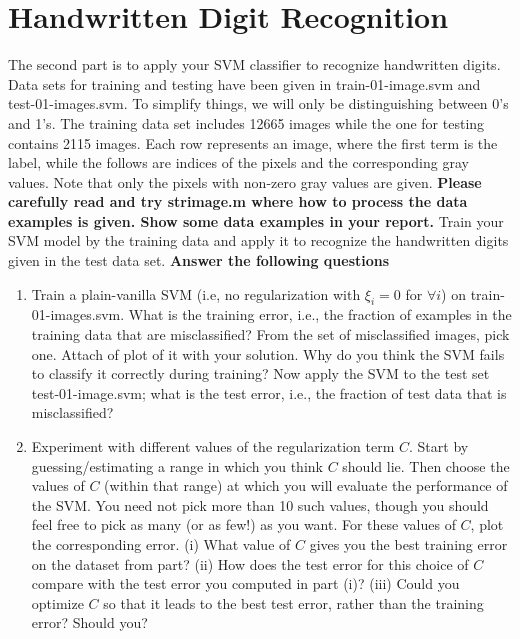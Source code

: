 \documentclass[10pt,a4paper]{article}
\begin{document}
\section{Handwritten Digit Recognition}
%
  The second part is to apply your SVM classifier to recognize handwritten digits. Data sets for training and testing have been given in \textsf{train-01-image.svm} and \textsf{test-01-images.svm}. To simplify things, we will only be distinguishing between 0's and 1's. The training data set includes 12665 images while the one for testing contains 2115 images. Each row represents an image, where the first term is the label, while the follows are indices of the pixels and the corresponding gray values. Note that only the pixels with non-zero gray values are given. \textbf{Please carefully read and try \textsf{strimage.m} where how to process the data examples is given. Show some data examples in your report.} Train your SVM model by the training data and apply it to recognize the handwritten digits given in the test data set. \textbf{Answer the following questions}
  \begin{enumerate}
    \item Train a plain-vanilla SVM (i.e, no regularization with $\xi_i = 0$ for $\forall i$) on \textsf{train-01-images.svm}. What is the training error, i.e., the fraction of examples in the training data that are misclassified? From the set of misclassified images, pick one. Attach of plot of it with your solution. Why do you think the SVM fails to classify it correctly during training? Now apply the SVM to the test set \textsf{test-01-image.svm}; what is the test error, i.e., the fraction of test data that is misclassified?
    \item Experiment with different values of the regularization term $C$. Start by guessing/estimating a range in which you think $C$ should lie. Then choose the values of $C$ (within that range) at which you will evaluate the performance of the SVM. You need not pick more than 10 such values, though you should feel free to pick as many (or as few!) as you want. For these values of $C$, plot the corresponding error. (i) What value of $C$ gives you the best training error on the dataset from part? (ii) How does the test error for this choice of $C$ compare with the test error you computed in part (i)? (iii) Could you optimize $C$ so that it leads to the best test error, rather than the training error? Should you?
  \end{enumerate}
\end{document}
